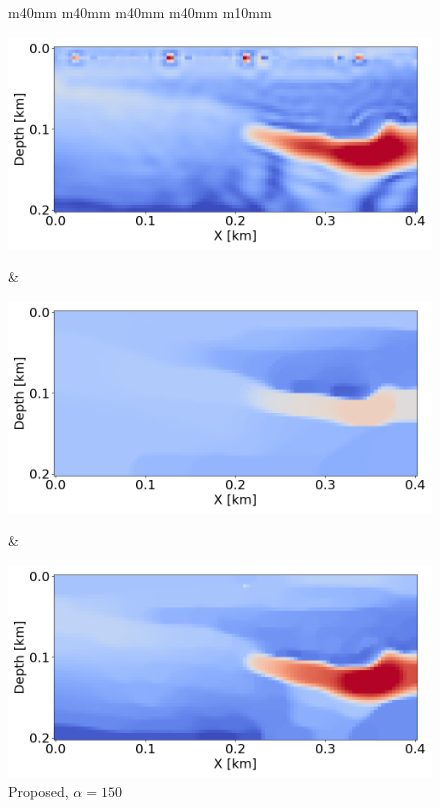 \begin{figure}[htbp]
    \centering
    \begin{tabular}{m{40mm} m{40mm} m{40mm} m{40mm} m{10mm}}
        \begin{minipage}[b]{\linewidth}
            \centering
            \includegraphics[width=\linewidth]{public/gradient}
            \vspace{-9mm}
            \caption*{}
            \vspace{1mm}
        \end{minipage} &
        \hspace{-5mm}
        \begin{minipage}[b]{\linewidth}
            \centering
            \includegraphics[width=\linewidth]{public/alpha_150}
            \vspace{-7mm}
            \caption*{Proposed, $\alpha = 150$}
            \vspace{1mm}
        \end{minipage} &
        \hspace{-10mm}
        \begin{minipage}[b]{\linewidth}
            \centering
            \includegraphics[width=\linewidth]{public/alpha_350}

\end{minipage}
\end{tabular}
\end{figure}
